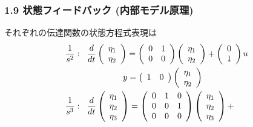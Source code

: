 \begin{frame}[t]
\frametitle{1.9 状態フィードバック (内部モデル原理)}
\vspace{-3mm}
それぞれの伝達関数の状態方程式表現は
\begin{align}
\frac{1}{s^2}: & \hspace*{3mm}
 \frac{d}{dt}
  \left(\begin{array}{c}
         \eta_1 \\
   \eta_2
  \end{array}\right)
  =
  \left(\begin{array}{cc}
         0 & 1 \\
   0 & 0
  \end{array}\right)
  \left(\begin{array}{c}
         \eta_1 \\
   \eta_2
  \end{array}\right)
  +
  \left(\begin{array}{c}
         0 \\
   1
  \end{array}\right)
  u
  \notag \\ & \hspace*{18mm}
  y =
  \left(\begin{array}{cc}
         1 & 0
  \end{array}\right)
  \left(\begin{array}{c}
         \eta_1 \\
   \eta_2
  \end{array}\right)
\\
\frac{1}{s^3}: &  \hspace*{3mm}
 \frac{d}{dt}
  \left(\begin{array}{c}
         \eta_1 \\
         \eta_2 \\
   \eta_3
  \end{array}\right)
  =
  \left(\begin{array}{ccc}
         0 & 1 & 0\\
   0 & 0 & 1\\
   0 & 0 & 0
  \end{array}\right)
  \left(\begin{array}{c}
         \eta_1 \\
         \eta_2 \\
   \eta_3
  \end{array}\right)
  +

\end{align}
\end{frame}
